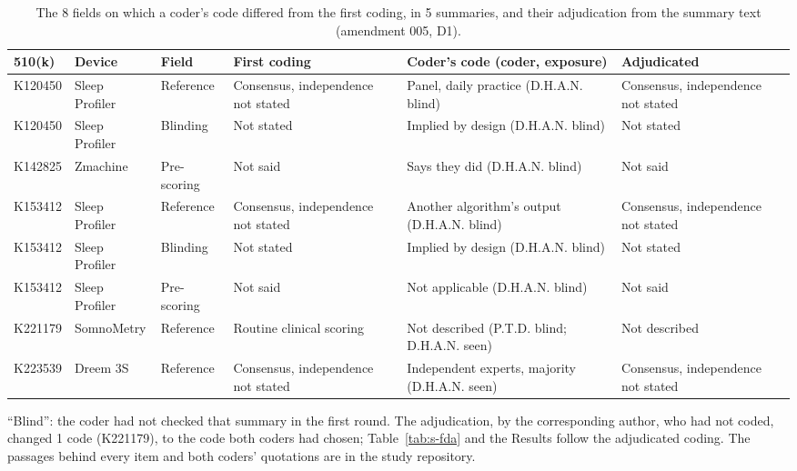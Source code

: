 \begin{table}[h!]
\centering
\footnotesize
\caption{The 8 fields on which a coder's code differed from the first coding, in 5 summaries, and their adjudication from the summary text (amendment 005, D1).}
\label{tab:s-d1-items}
\begin{adjustbox}{max width=\linewidth}
\begin{tabular}{llllll}
\toprule
510(k) & Device & Field & First coding & Coder's code (coder, exposure) & Adjudicated \\
\midrule
K120450 & Sleep Profiler & Reference & Consensus, independence not stated & Panel, daily practice (D.H.A.N. blind) & Consensus, independence not stated \\
K120450 & Sleep Profiler & Blinding & Not stated & Implied by design (D.H.A.N. blind) & Not stated \\
K142825 & Zmachine & Pre-scoring & Not said & Says they did (D.H.A.N. blind) & Not said \\
K153412 & Sleep Profiler & Reference & Consensus, independence not stated & Another algorithm's output (D.H.A.N. blind) & Consensus, independence not stated \\
K153412 & Sleep Profiler & Blinding & Not stated & Implied by design (D.H.A.N. blind) & Not stated \\
K153412 & Sleep Profiler & Pre-scoring & Not said & Not applicable (D.H.A.N. blind) & Not said \\
K221179 & SomnoMetry & Reference & Routine clinical scoring & Not described (P.T.D. blind; D.H.A.N. seen) & Not described \\
K223539 & Dreem 3S & Reference & Consensus, independence not stated & Independent experts, majority (D.H.A.N. seen) & Consensus, independence not stated \\
\bottomrule
\end{tabular}
\end{adjustbox}
\par\smallskip
\begin{minipage}{0.95\linewidth}\footnotesize ``Blind'': the coder had not checked that summary in the first round. The adjudication, by the corresponding author, who had not coded, changed 1 code (K221179), to the code both coders had chosen; Table~\ref{tab:s-fda} and the Results follow the adjudicated coding. The passages behind every item and both coders' quotations are in the study repository.\end{minipage}
\end{table}
